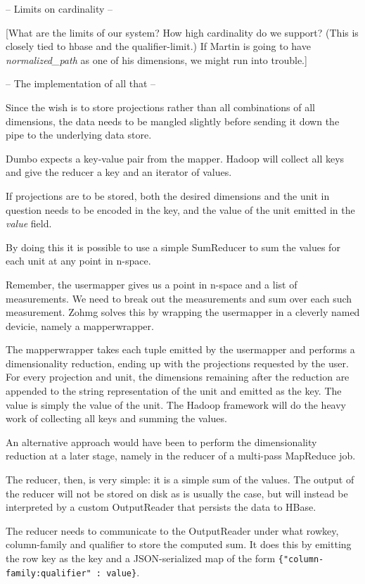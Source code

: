 \documentclass[a4paper,10pt]{book}
\begin{document}
-- Limits on cardinality --

[What are the limits of our system? How high cardinality do we support? (This
is closely tied to hbase and the qualifier-limit.) If Martin is going to have
\textit{normalized\_path} as one of his dimensions, we might run into trouble.]

-- The implementation of all that --

Since the wish is to store projections rather than all combinations of all
dimensions, the data needs to be mangled slightly before sending it down
the pipe to the underlying data store.

Dumbo expects a key-value pair from the mapper. Hadoop will collect all keys
and give the reducer a key and an iterator of values.

If projections are to be stored, both the desired dimensions and the unit
in question needs to be encoded in the key, and the value of the unit
emitted in the \textit{value} field.

By doing this it is possible to use a simple SumReducer to sum the values
for each unit at any point in n-space.

Remember, the usermapper gives us a point in n-space and a list of
measurements. We need to break out the measurements and sum over each such
measurement. Zohmg solves this by wrapping the usermapper in a cleverly named
devicie, namely a mapperwrapper.

The mapperwrapper takes each tuple emitted by the usermapper and performs a
dimensionality reduction, ending up with the projections requested by the
user. For every projection and unit, the dimensions remaining after the
reduction are appended to the string representation of the unit and emitted
as the key. The value is simply the value of the unit. The Hadoop framework
will do the heavy work of collecting all keys and summing the values.

An alternative approach would have been to perform the dimensionality
reduction at a later stage, namely in the reducer of a multi-pass MapReduce
job.

The reducer, then, is very simple: it is a simple sum of the values. The output
of the reducer will not be stored on disk as is usually the case, but will
instead be interpreted by a custom OutputReader that persists the data to
HBase.

The reducer needs to communicate to the OutputReader under what rowkey,
column-family and qualifier to store the computed sum. It does this by
emitting the row key as the key and a JSON-serialized map of the form
\texttt{\{"column-family:qualifier" : value\}}.
\end{document}

